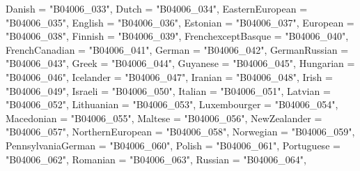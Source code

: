 \documentclass[
]{article}
\newenvironment{Shaded}{\begin{snugshade}}{\end{snugshade}}
\newcommand{\DataTypeTok}[1]{\textcolor[rgb]{0.13,0.29,0.53}{#1}}
\newcommand{\NormalTok}[1]{#1}
\newcommand{\StringTok}[1]{\textcolor[rgb]{0.31,0.60,0.02}{#1}}
\begin{document}
\begin{Shaded}
\begin{Highlighting}[]
                   \DataTypeTok{Danish =} \StringTok{"B04006_033"}\NormalTok{,}
                   \DataTypeTok{Dutch =} \StringTok{"B04006_034"}\NormalTok{,}
                   \DataTypeTok{EasternEuropean =} \StringTok{"B04006_035"}\NormalTok{,}
                   \DataTypeTok{English =} \StringTok{"B04006_036"}\NormalTok{,}
                   \DataTypeTok{Estonian =} \StringTok{"B04006_037"}\NormalTok{,}
                   \DataTypeTok{European =} \StringTok{"B04006_038"}\NormalTok{,}
                   \DataTypeTok{Finnish =} \StringTok{"B04006_039"}\NormalTok{,}
                   \DataTypeTok{FrenchexceptBasque =} \StringTok{"B04006_040"}\NormalTok{,}
                   \DataTypeTok{FrenchCanadian =} \StringTok{"B04006_041"}\NormalTok{,}
                   \DataTypeTok{German =} \StringTok{"B04006_042"}\NormalTok{,}
                   \DataTypeTok{GermanRussian =} \StringTok{"B04006_043"}\NormalTok{,}
                   \DataTypeTok{Greek =} \StringTok{"B04006_044"}\NormalTok{,}
                   \DataTypeTok{Guyanese =} \StringTok{"B04006_045"}\NormalTok{,}
                   \DataTypeTok{Hungarian =} \StringTok{"B04006_046"}\NormalTok{,}
                   \DataTypeTok{Icelander =} \StringTok{"B04006_047"}\NormalTok{,}
                   \DataTypeTok{Iranian =} \StringTok{"B04006_048"}\NormalTok{,}
                   \DataTypeTok{Irish =} \StringTok{"B04006_049"}\NormalTok{,}
                   \DataTypeTok{Israeli =} \StringTok{"B04006_050"}\NormalTok{,}
                   \DataTypeTok{Italian =} \StringTok{"B04006_051"}\NormalTok{,}
                   \DataTypeTok{Latvian =} \StringTok{"B04006_052"}\NormalTok{,}
                   \DataTypeTok{Lithuanian =} \StringTok{"B04006_053"}\NormalTok{,}
                   \DataTypeTok{Luxembourger =} \StringTok{"B04006_054"}\NormalTok{,}
                   \DataTypeTok{Macedonian =} \StringTok{"B04006_055"}\NormalTok{,}
                   \DataTypeTok{Maltese =} \StringTok{"B04006_056"}\NormalTok{,}
                   \DataTypeTok{NewZealander =} \StringTok{"B04006_057"}\NormalTok{,}
                   \DataTypeTok{NorthernEuropean =} \StringTok{"B04006_058"}\NormalTok{,}
                   \DataTypeTok{Norwegian =} \StringTok{"B04006_059"}\NormalTok{,}
                   \DataTypeTok{PennsylvaniaGerman =} \StringTok{"B04006_060"}\NormalTok{,}
                   \DataTypeTok{Polish =} \StringTok{"B04006_061"}\NormalTok{,}
                   \DataTypeTok{Portuguese =} \StringTok{"B04006_062"}\NormalTok{,}
                   \DataTypeTok{Romanian =} \StringTok{"B04006_063"}\NormalTok{,}
                   \DataTypeTok{Russian =} \StringTok{"B04006_064"}\NormalTok{,}

\end{Highlighting}
\end{Shaded}
\end{document}
